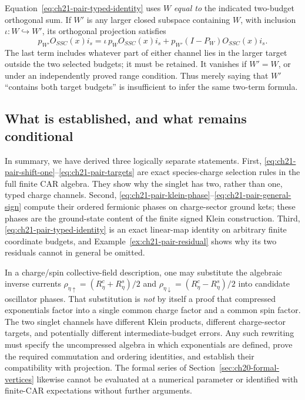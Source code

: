 \begin{remark}
\label{rem:ch21-pair-enlarged-target}
Equation~\eqref{eq:ch21-pair-typed-identity} uses \(W\) \emph{equal to}
the indicated two-budget orthogonal sum.  If \(W'\) is any larger
closed subspace containing \(W\), with inclusion
\(\iota:W\hookrightarrow W'\), its orthogonal projection satisfies
\begin{equation}
 p_{W'}O_{SSC}(x)i_s
  =\iota\,p_WO_{SSC}(x)i_s
     +p_{W'}(I-P_W)O_{SSC}(x)i_s.
 \label{eq:ch21-pair-larger-target}
\end{equation}
The last term includes whatever part of either channel lies in the
larger target outside the two selected budgets; it must be retained.
It vanishes if \(W'=W\), or under an independently proved range
condition.  Thus merely saying that \(W'\) ``contains both target
budgets'' is insufficient to infer the same two-term formula.
\end{remark}

\subsection*{What is established, and what remains conditional}

In summary, we have derived three logically separate statements.  First,
\eqref{eq:ch21-pair-shift-one}--\eqref{eq:ch21-pair-targets} are exact
species-charge selection rules in the full finite CAR algebra.  They
show why the singlet has two, rather than one, typed charge channels.
Second, \eqref{eq:ch21-pair-klein-phase}--\eqref{eq:ch21-pair-general-sign}
compute their ordered fermionic phases on charge-sector ground kets;
these phases are the ground-state content of the finite signed Klein
construction.  Third, \eqref{eq:ch21-pair-typed-identity} is an exact
linear-map identity on arbitrary finite coordinate budgets, and
Example~\ref{ex:ch21-pair-residual} shows why its two residuals cannot
in general be omitted.

In a charge/spin collective-field description, one may substitute the
algebraic inverse currents
\(\rho_{\eta\uparrow}=(R^c_\eta+R^s_\eta)/2\) and
\(\rho_{\eta\downarrow}=(R^c_\eta-R^s_\eta)/2\) into candidate
oscillator phases.  That substitution is \emph{not} by itself a proof
that compressed exponentials factor into a single common charge factor
and a common spin factor.  The two singlet channels have different
Klein products, different charge-sector targets, and potentially
different intermediate-budget errors.  Any such rewriting must specify
the uncompressed algebra in which exponentials are defined, prove the
required commutation and ordering identities, and establish their
compatibility with projection.  The formal series of
Section~\ref{sec:ch20-formal-vertices} likewise cannot be evaluated
at a numerical parameter or identified with finite-CAR expectations
without further arguments.

